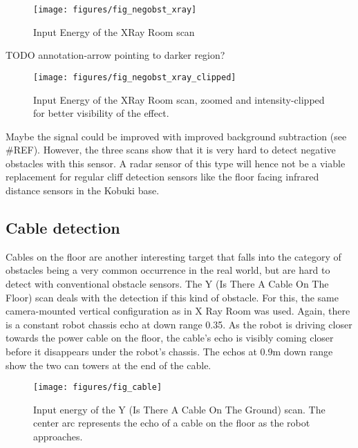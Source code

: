 \begin{figure}[htp]
    \centering
    \texttt{[image: figures/fig\_negobst\_xray]}
    \caption{Input Energy of the XRay Room scan}
    \label{fig:negobst_xray}
\end{figure}

TODO annotation-arrow pointing to darker region?

\begin{figure}[htp]
    \centering
    \texttt{[image: figures/fig\_negobst\_xray\_clipped]}
    \caption{Input Energy of the XRay Room scan, zoomed and intensity-clipped for better visibility of the effect.}
    \label{fig:negobst_xray_clipped}
\end{figure}

Maybe the signal could be improved with improved background subtraction
(see \#REF). However, the three scans show that it is very hard to
detect negative obstacles with this sensor. A radar sensor of this type
will hence not be a viable replacement for regular cliff detection
sensors like the floor facing infrared distance sensors in the Kobuki
base.

\subsection{Cable detection}\label{cable-detection}

Cables on the floor are another interesting target that falls into the
category of obstacles being a very common occurrence in the real world,
but are hard to detect with conventional obstacle sensors. The Y (Is
There A Cable On The Floor) scan deals with the detection if this kind
of obstacle. For this, the same camera-mounted vertical configuration as
in X Ray Room was used. Again, there is a constant robot chassis echo at
down range 0.35. As the robot is driving closer towards the power cable
on the floor, the cable's echo is visibly coming closer before it
disappears under the robot's chassis. The echos at 0.9m down range show
the two can towers at the end of the cable.

\begin{figure}[htp]
    \centering
    \texttt{[image: figures/fig\_cable]}
    \caption{Input energy of the Y (Is There A Cable On The Ground) scan. The center arc represents the echo of a cable on the floor as the robot approaches.}
    \label{fig:cable}
\end{figure}

